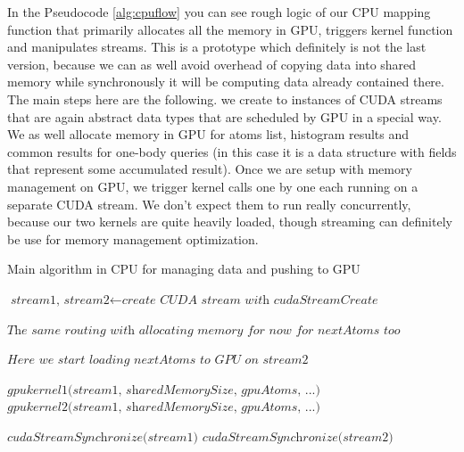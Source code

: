 \documentclass[11pt,a4paper]{report}
\begin{document}
In the Pseudocode \ref{alg:cpuflow} you can see rough logic of our CPU mapping function that primarily allocates all the memory in GPU, triggers kernel function and manipulates streams. This is a prototype which definitely is not the last version, because we can as well avoid overhead of copying data into shared memory while synchronously it will be computing data already contained there. The main steps here are the following. we create to instances of CUDA streams that are again abstract data types that are scheduled by GPU in a special way. We as well allocate memory in GPU for atoms list, histogram results and common results for one-body queries (in this case it is a data structure with fields that represent some accumulated result). Once we are setup with memory management on GPU, we trigger kernel calls one by one each running on a separate CUDA stream. We don't expect them to run really concurrently, because our two kernels are quite heavily loaded, though streaming can definitely be use for memory management optimization.


\vspace{1cm}
\begin{algorithm}
\caption{Main algorithm in CPU for managing data and pushing to GPU}
\label{alg:cpuflowfuture}
\begin{algorithmic}[1]

\State $\textit{stream1, stream2} \gets \textit{create CUDA stream with cudaStreamCreate}$

\State
\State $\textit{The same routing with allocating memory for now for nextAtoms too}$

\State
\State $\textit{Here we start loading nextAtoms to GPU on stream2 }$
\State


\State $\textit{gpukernel1(stream1, sharedMemorySize, gpuAtoms, ...)}$
\State $\textit{gpukernel2(stream1, sharedMemorySize, gpuAtoms, ...)}$

\State
\State $\textit{cudaStreamSynchronize(stream1)}$
\State $\textit{cudaStreamSynchronize(stream2)}$

\EndFor

\EndProcedure
\end{algorithmic}
\end{algorithm}
\end{document}
